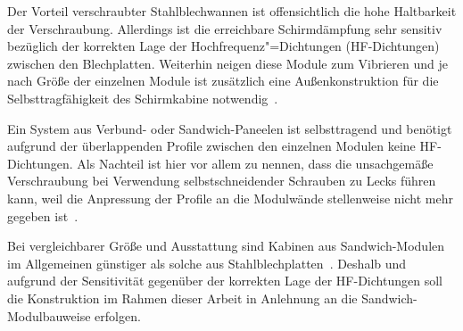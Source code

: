 Der Vorteil verschraubter Stahlblechwannen ist offensichtlich die hohe Haltbarkeit der Verschraubung. Allerdings ist die erreichbare Schirmdämpfung sehr sensitiv bezüglich der korrekten Lage der Hochfrequenz"=Dichtungen (HF-Dichtungen) zwischen den Blechplatten. Weiterhin neigen diese Module zum Vibrieren und je nach Größe der einzelnen Module ist zusätzlich eine Außenkonstruktion für die Selbsttragfähigkeit des Schirmkabine notwendig~\cite{EM_Schirmung}.
\par
\vspace{\linespace}
Ein System aus Verbund- oder Sandwich-Paneelen ist selbsttragend und benötigt aufgrund der überlappenden Profile zwischen den einzelnen Modulen keine HF-Dichtungen. Als Nachteil ist hier vor allem zu nennen, dass die unsachgemäße Verschraubung bei Verwendung selbstschneidender Schrauben zu Lecks führen kann, weil die Anpressung der Profile an die Modulwände stellenweise nicht mehr gegeben ist~\cite{EM_Schirmung}. 
\par
\vspace{\linespace}
Bei vergleichbarer Größe und Ausstattung sind Kabinen aus Sandwich-Modulen im Allgemeinen günstiger als solche aus Stahlblechplatten~\cite{EMC-Technik_Sandwichmodul, EMC-Technik_Stahlblechplatten}. Deshalb und aufgrund der Sensitivität gegenüber der korrekten Lage der HF-Dichtungen soll die Konstruktion im Rahmen dieser Arbeit in Anlehnung an die Sandwich-Modulbauweise erfolgen. 





